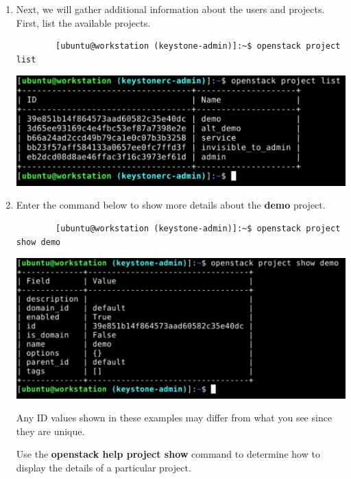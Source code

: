 \documentclass[letterpaper, 12pt]{article}
\begin{document}
\begin{enumerate}
    \item Next, we will gather additional information about the users and projects. First, list the available projects.
    \begin{lstlisting}
        [ubuntu@workstation (keystone-admin)]:~$ openstack project list
    \end{lstlisting}

    \begin{center}
        \includegraphics[width=\linewidth]{images/part2/step5.png}
    \end{center}

    \item Enter the command below to show more details about the \textbf{demo} project.
    \begin{lstlisting}
        [ubuntu@workstation (keystone-admin)]:~$ openstack project show demo
    \end{lstlisting}

    \begin{center}
        \includegraphics[width=\linewidth]{images/part2/step6.png}
    \end{center}

    \begin{notebox}
        Any ID values shown in these examples may differ from what you see since they are unique.
    \end{notebox}

    \begin{tipbox}
        Use the \textbf{openstack help project show} command to determine how to display the details of a particular
        project.
    \end{tipbox}


\end{enumerate}
\end{document}
